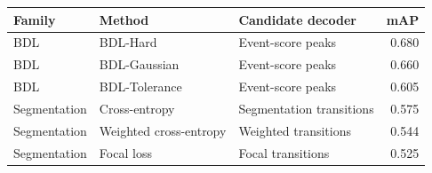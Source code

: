 \begin{tabular}{lllr}
\toprule
Family & Method & Candidate decoder & mAP \\
\midrule
BDL & BDL-Hard & Event-score peaks & 0.680 \\
BDL & BDL-Gaussian & Event-score peaks & 0.660 \\
BDL & BDL-Tolerance & Event-score peaks & 0.605 \\
Segmentation & Cross-entropy & Segmentation transitions & 0.575 \\
Segmentation & Weighted cross-entropy & Weighted transitions & 0.544 \\
Segmentation & Focal loss & Focal transitions & 0.525 \\
\bottomrule
\end{tabular}
